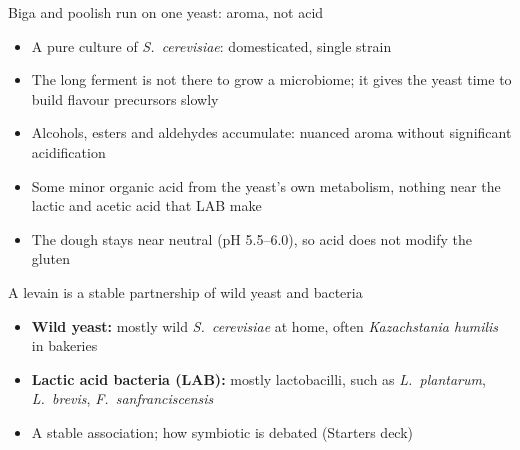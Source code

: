 \documentclass[aspectratio=169,11pt]{beamer}
\begin{document}
\begin{frame}{Biga and poolish run on one yeast: aroma, not acid}
  \begin{itemize}\setlength{\itemsep}{0.35em}
    \item A pure culture of \textit{S.~cerevisiae}: domesticated, single strain
    \item The long ferment is not there to grow a microbiome; it gives the
      yeast time to build flavour precursors slowly
    \item Alcohols, esters and aldehydes accumulate: nuanced aroma without
      significant acidification
    \item Some minor organic acid from the yeast's own metabolism, nothing
      near the lactic and acetic acid that LAB make
    \item The dough stays near neutral (pH 5.5--6.0), so acid does not modify
      the gluten
  \end{itemize}
\end{frame}

\begin{frame}{A levain is a stable partnership of wild yeast and bacteria}
  \begin{itemize}\setlength{\itemsep}{0.3em}
    \item \textbf{Wild yeast:} mostly wild \textit{S.\ cerevisiae} at home,
      often \textit{Kazachstania humilis} in bakeries
    \item \textbf{Lactic acid bacteria (LAB):} mostly lactobacilli, such as
      \textit{L.\ plantarum}, \textit{L.\ brevis}, \textit{F.\ sanfranciscensis}
    \item A stable association; how symbiotic is debated (Starters deck)
  \end{itemize}
  \bigskip
  \centering
  \raggedright
\end{frame}
\end{document}
